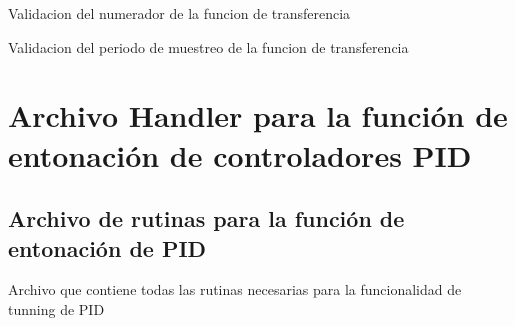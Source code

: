 \documentclass[letterpaper,10pt,spanish]{sphinxmanual}
\begin{document}

\begin{fulllineitems}
\label{\detokenize{codigos/analisisHandler:analisisHandler.tfnum_validator}}
Validacion del numerador de la funcion de transferencia

\end{fulllineitems}


\begin{fulllineitems}
\label{\detokenize{codigos/analisisHandler:analisisHandler.tfperiodo_validator}}
Validacion del periodo de muestreo de la funcion de transferencia

\end{fulllineitems}



\section{Archivo Handler para la función de entonación de controladores PID}
\label{\detokenize{codigos/TuningHandler:archivo-handler-para-la-funcion-de-entonacion-de-controladores-pid}}\label{\detokenize{codigos/TuningHandler::doc}}

\subsection{Archivo de rutinas para la función de entonación de PID}
\label{\detokenize{codigos/rutinas_PID:archivo-de-rutinas-para-la-funcion-de-entonacion-de-pid}}\label{\detokenize{codigos/rutinas_PID::doc}}\label{\detokenize{codigos/rutinas_PID:module-rutinas_PID}}
Archivo que contiene todas las rutinas necesarias para la funcionalidad de tunning de PID
\end{document}
